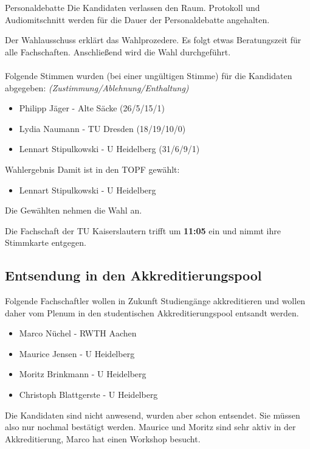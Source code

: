     \begin{info}{Personaldebatte}
      Die Kandidaten verlassen den Raum. Protokoll und Audiomitschnitt werden für die Dauer der Personaldebatte angehalten.
    \end{info}

    Der Wahlausschuss erklärt das Wahlprozedere.
    Es folgt etwas Beratungszeit für alle Fachschaften. Anschließend wird die Wahl durchgeführt. \\ \\

    Folgende Stimmen wurden (bei einer ungültigen Stimme) für die Kandidaten abgegeben: \textit{(Zustimmung/Ablehnung/Enthaltung)}
    \begin{itemize}
      \item Philipp Jäger - Alte Säcke  (26/5/15/1)
      \item Lydia Naumann - TU Dresden  (18/19/10/0)
      \item Lennart Stipulkowski - U Heidelberg  (31/6/9/1)
    \end{itemize}

    \begin{success}{Wahlergebnis}
      Damit ist in den TOPF gewählt:
      \begin{itemize}
        \item Lennart Stipulkowski - U Heidelberg
      \end{itemize}
      \tcblower
      Die Gewählten nehmen die Wahl an.
    \end{success}

    \begin{info}{}
      Die Fachschaft der TU Kaiserslautern trifft um \textbf{11:05} ein und nimmt ihre Stimmkarte entgegen.
    \end{info}

  \subsection{Entsendung in den Akkreditierungspool}
    Folgende Fachschaftler wollen in Zukunft Studiengänge akkreditieren und wollen daher vom Plenum in den studentischen Akkreditierungspool entsandt werden.
    \begin{itemize}
      \item Marco Nüchel - RWTH Aachen
      \item Maurice Jensen - U Heidelberg
      \item Moritz Brinkmann - U Heidelberg
      \item Christoph Blattgerste - U Heidelberg
    \end{itemize}
    Die Kandidaten sind nicht anwesend, wurden aber schon entsendet. Sie müssen also nur nochmal bestätigt werden. Maurice und Moritz sind sehr aktiv in der Akkreditierung, Marco hat einen Workshop besucht. \\

